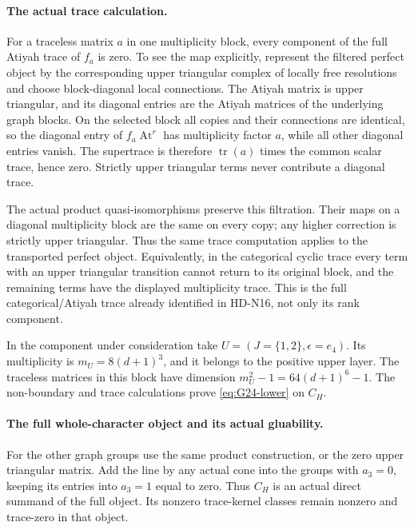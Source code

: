 \paragraph{The actual trace calculation.}
For a traceless matrix \(a\) in one multiplicity block, every
component of the full Atiyah trace of \(f_a\) is zero.
To see the map explicitly, represent the filtered perfect object
by the corresponding upper triangular complex of locally free
resolutions and choose block-diagonal local connections. The Atiyah
matrix is upper triangular, and its diagonal entries are the Atiyah
matrices of the underlying graph blocks. On the selected block all
copies and their connections are identical, so the diagonal entry
of \(f_a\operatorname{At}^r\) has multiplicity factor \(a\),
while all other diagonal entries vanish. The supertrace is therefore
\(\operatorname{tr}(a)\) times the common scalar trace, hence zero.
Strictly upper triangular terms never contribute a diagonal trace.

The actual product quasi-isomorphisms preserve this filtration.
Their maps on a diagonal multiplicity block are the same on every
copy; any higher correction is strictly upper triangular. Thus the
same trace computation applies to the transported perfect object.
Equivalently, in the categorical cyclic trace every term with an
upper triangular transition cannot return to its original block,
and the remaining terms have the displayed multiplicity trace.
This is the full categorical/Atiyah trace already identified in
HD-N16, not only its rank component.

In the component under consideration take
\(U=(J=\{1,2\},\epsilon=e_4)\). Its multiplicity is
\(m_U=8(d+1)^3\), and it belongs to the positive upper layer.
The traceless matrices in this block have dimension
\(m_U^2-1=64(d+1)^6-1\). The non-boundary and trace calculations
prove \eqref{eq:G24-lower} on \(C_H\).

\paragraph{The full whole-character object and its actual gluability.}
For the other graph groups use the same product construction, or
the zero upper triangular matrix. Add the line by any actual cone
into the groups with \(a_3=0\), keeping its entries into
\(a_3=1\) equal to zero. Thus \(C_H\) is an actual direct
summand of the full object. Its nonzero trace-kernel classes remain
nonzero and trace-zero in that object.


